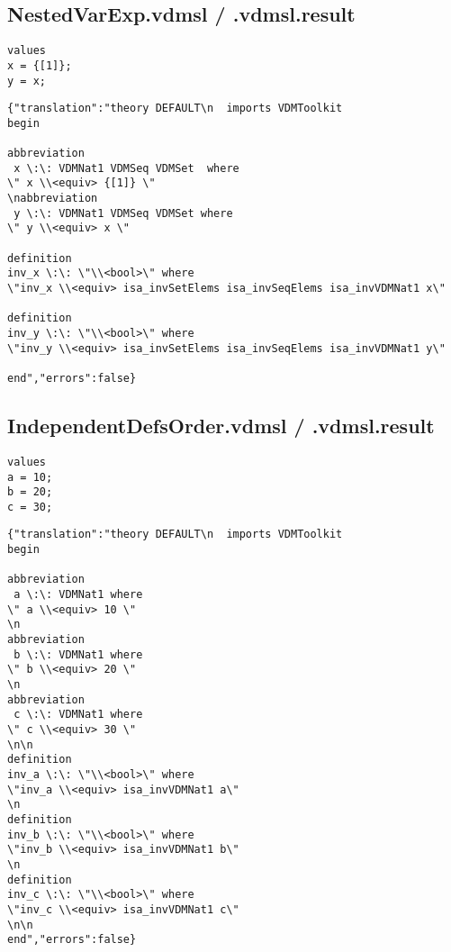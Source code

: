 \begin{appendices}
\subsection{NestedVarExp.vdmsl / .vdmsl.result}
\begin{lstlisting}
values
x = {[1]};
y = x;

\end{lstlisting}

\begin{lstlisting}
{"translation":"theory DEFAULT\n  imports VDMToolkit
begin

abbreviation
 x \:\: VDMNat1 VDMSeq VDMSet  where 
\" x \\<equiv> {[1]} \" 
\nabbreviation
 y \:\: VDMNat1 VDMSeq VDMSet where 
\" y \\<equiv> x \" 

definition
inv_x \:\: \"\\<bool>\" where
\"inv_x \\<equiv> isa_invSetElems isa_invSeqElems isa_invVDMNat1 x\"

definition
inv_y \:\: \"\\<bool>\" where
\"inv_y \\<equiv> isa_invSetElems isa_invSeqElems isa_invVDMNat1 y\"

end","errors":false}
\end{lstlisting}

\subsection{IndependentDefsOrder.vdmsl / .vdmsl.result}
\begin{lstlisting}
values
a = 10;
b = 20;
c = 30;
\end{lstlisting}

\begin{lstlisting}
{"translation":"theory DEFAULT\n  imports VDMToolkit
begin

abbreviation
 a \:\: VDMNat1 where 
\" a \\<equiv> 10 \" 
\n
abbreviation
 b \:\: VDMNat1 where 
\" b \\<equiv> 20 \" 
\n
abbreviation
 c \:\: VDMNat1 where 
\" c \\<equiv> 30 \" 
\n\n
definition
inv_a \:\: \"\\<bool>\" where
\"inv_a \\<equiv> isa_invVDMNat1 a\"
\n
definition
inv_b \:\: \"\\<bool>\" where
\"inv_b \\<equiv> isa_invVDMNat1 b\"
\n
definition
inv_c \:\: \"\\<bool>\" where
\"inv_c \\<equiv> isa_invVDMNat1 c\"
\n\n
end","errors":false}
\end{lstlisting}


\end{appendices}

